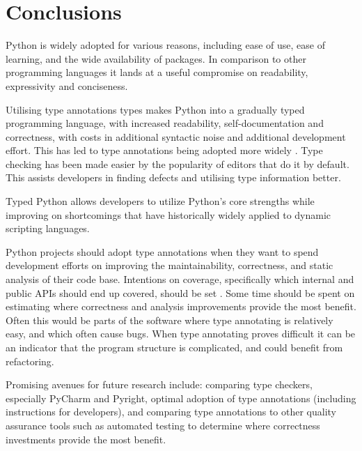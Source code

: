 \chapter{Conclusions\label{conclusions}}

Python is widely adopted for various reasons, including ease of use, ease of learning, and the wide availability of packages. In comparison to other programming languages it lands at a useful compromise on readability, expressivity and conciseness.

Utilising type annotations types makes Python into a gradually typed programming language, with increased readability, self-documentation and correctness, with costs in additional syntactic noise and additional development effort. This has led to type annotations being adopted more widely \cite{jin_where_to_start_2021, khan_empirical_2022}. Type checking has been made easier by the popularity of editors that do it by default. This assists developers in finding defects and utilising type information better. 

Typed Python allows developers to utilize Python's core strengths while improving on shortcomings that have historically widely applied to dynamic scripting languages.

Python projects should adopt type annotations when they want to spend development efforts on improving the maintainability, correctness, and static analysis of their code base. Intentions on coverage, specifically which internal and public APIs should end up covered, should be set  \cite{jin_where_to_start_2021}. Some time should be spent on estimating where correctness and analysis improvements provide the most benefit. Often this would be parts of the software where type annotating is relatively easy, and which often cause bugs. When type annotating proves difficult it can be an indicator that the program structure is complicated, and could benefit from refactoring.

Promising avenues for future research include: comparing type checkers, especially PyCharm and Pyright, optimal adoption of type annotations (including instructions for developers), and comparing type annotations to other quality assurance tools such as automated testing to determine where correctness investments provide the most benefit. 



